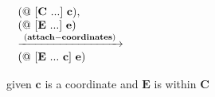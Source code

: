 \newcommand{\lam}[2]{\lambda#1.\,#2}

\begin{flushleft}

$\begin{array}{l}
\begin{array}{l}
  (@~[\mathbf{C}~...]~\mathbf{c}),\\
  (@~[\mathbf{E}~...]~\mathbf{e})\\
  \xrightarrow{\hspace*{0.1cm}\mathbf{(attach-coordinates)}\hspace*{0.1cm}}\\
  (@~[\mathbf{E}~...~\mathbf{c}]~\mathbf{e})\\

  
\end{array}\\[0.1cm]

\end{array}$

\end{flushleft}
given $\mathbf{c}$ is a coordinate and $\mathbf{E }$ is within $\mathbf{C}$
